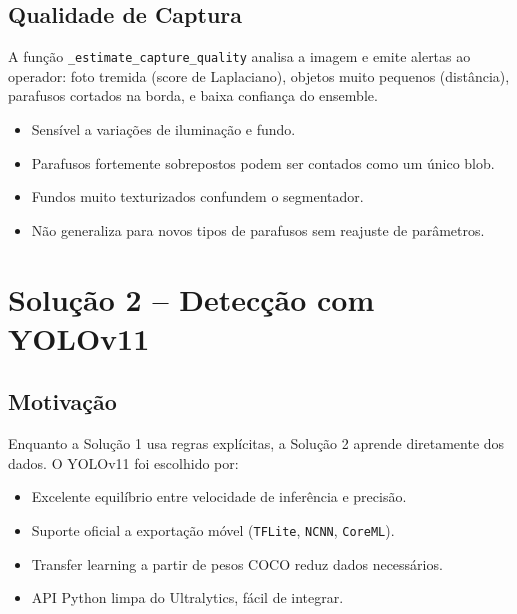 \documentclass[12pt,a4paper]{article}
\begin{document}
\subsection{Qualidade de Captura}

A fun\c{c}\~ao \texttt{\_estimate\_capture\_quality} analisa a imagem e emite alertas
ao operador: foto tremida (score de Laplaciano), objetos muito pequenos (dist\^ancia),
parafusos cortados na borda, e baixa confian\c{c}a do ensemble.

\begin{tcolorbox}[limitacao={Limita\c{c}\~oes da Solu\c{c}\~ao 1}]
\begin{itemize}[leftmargin=*, noitemsep]
  \item Sens\'ivel a varia\c{c}\~oes de ilumina\c{c}\~ao e fundo.
  \item Parafusos fortemente sobrepostos podem ser contados como um \'unico blob.
  \item Fundos muito texturizados confundem o segmentador.
  \item N\~ao generaliza para novos tipos de parafusos sem reajuste de par\^ametros.
\end{itemize}
\end{tcolorbox}

\section{Solu\c{c}\~ao 2 -- Detec\c{c}\~ao com YOLOv11}
\label{sec:sol2}

\subsection{Motiva\c{c}\~ao}

Enquanto a Solu\c{c}\~ao 1 usa regras expl\'icitas, a Solu\c{c}\~ao 2 aprende
diretamente dos dados. O YOLOv11 foi escolhido por:

\begin{itemize}[leftmargin=*]
  \item Excelente equil\'ibrio entre velocidade de infer\^encia e precis\~ao.
  \item Suporte oficial a exporta\c{c}\~ao m\'ovel (\texttt{TFLite}, \texttt{NCNN},
        \texttt{CoreML}).
  \item Transfer learning a partir de pesos COCO reduz dados necess\'arios.
  \item API Python limpa do Ultralytics, f\'acil de integrar.
\end{itemize}
\end{document}
